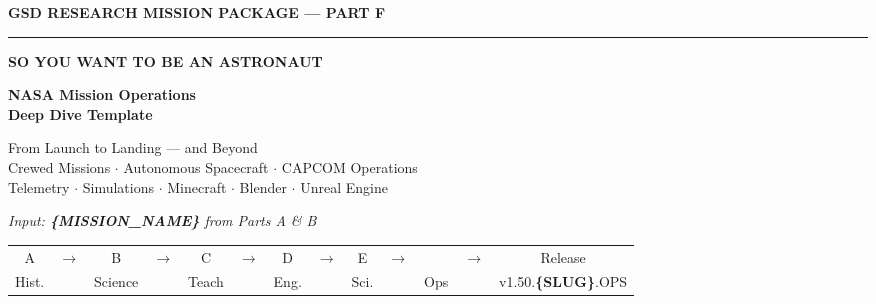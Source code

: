 \documentclass[11pt,letterpaper]{article}
\newcommand{\param}[1]{\textcolor{paramred}{\textbf{\{#1\}}}}
\begin{document}
\thispagestyle{empty}
\begin{center}
\vspace*{1.5cm}

{\small\sffamily\textcolor{primary}{\textbf{GSD RESEARCH MISSION PACKAGE --- PART F}}}

\vspace{0.3cm}
\textcolor{bordergray}{\rule{10cm}{0.4pt}}

\vspace{0.8cm}
{\fontsize{12}{15}\selectfont\sffamily\textcolor{secondary}{\textbf{SO YOU WANT TO BE AN ASTRONAUT}}}

\vspace{0.4cm}
{\fontsize{20}{26}\selectfont\bfseries\sffamily\textcolor{primary}{NASA Mission Operations\\[0.3em]Deep Dive Template}}

\vspace{0.5cm}
{\large\sffamily\textcolor{tertiary}{From Launch to Landing --- and Beyond}}\\[0.3em]
{\normalsize\sffamily\textcolor{secondary}{Crewed Missions $\cdot$ Autonomous Spacecraft $\cdot$ CAPCOM Operations}}\\[0.2em]
{\normalsize\sffamily\textcolor{accent}{Telemetry $\cdot$ Simulations $\cdot$ Minecraft $\cdot$ Blender $\cdot$ Unreal Engine}}

\vspace{0.4cm}
{\large\sffamily\itshape\textcolor{accent}{Input: \param{MISSION\_NAME} from Parts A \& B}}

\vspace{1.2cm}
\begin{center}
\footnotesize\sffamily
\begin{tabular}{ccccccccccccc}
\textcolor{subtlegray}{A} & \textcolor{subtlegray}{$\to$} &
\textcolor{subtlegray}{B} & \textcolor{subtlegray}{$\to$} &
\textcolor{subtlegray}{C} & \textcolor{subtlegray}{$\to$} &
\textcolor{subtlegray}{D} & \textcolor{subtlegray}{$\to$} &
\textcolor{subtlegray}{E} & \textcolor{subtlegray}{$\to$} &
\colorbox{primary}{\textcolor{white}{\bfseries\ F\ }} &
\textcolor{subtlegray}{$\to$} &
\textcolor{subtlegray}{Release}\\[2pt]
{\tiny\textcolor{subtlegray}{Hist.}} & &
{\tiny\textcolor{subtlegray}{Science}} & &
{\tiny\textcolor{subtlegray}{Teach}} & &
{\tiny\textcolor{subtlegray}{Eng.}} & &
{\tiny\textcolor{subtlegray}{Sci.}} & &
{\tiny\textcolor{subtlegray}{Ops}} & &
{\tiny\textcolor{subtlegray}{v1.50.\param{SLUG}.OPS}}
\end{tabular}
\end{center}


\end{center}
\end{document}
